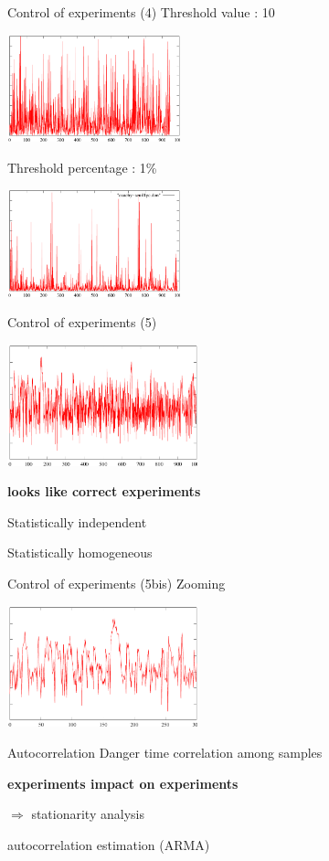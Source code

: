 \documentclass[xcolor=x11names,compress,8pt,
]{beamer}
\renewcommand{\(}{\begin{columns}}
\renewcommand{\)}{\end{columns}}
\newcommand{\<}[1]{\begin{column}{#1}}
\renewcommand{\>}{\end{column}}
\begin{document}
\begin{frame}{Control of experiments (4)}
Threshold value : 10
\begin{center}
\includegraphics[width=5cm]{CE-cauchy-seuil10.pdf}
\end{center}
Threshold percentage  : 1\%
\begin{center}
\includegraphics[width=5cm]{CE-cauchy-seuil1pc.pdf}
\end{center}

\end{frame}
\begin{frame}{Control of experiments (5)}
\begin{center}
\includegraphics[width=5.5cm]{CE-deptempo.pdf}
\end{center}
\pause
\begin{block}{}
\alert{\bf  looks like correct experiments}

Statistically independent

Statistically homogeneous
\end{block}
\end{frame}

\begin{frame}{Control of experiments (5bis)}
Zooming
\begin{center}
\includegraphics[width=5.5cm]{CE-deptempo-zoom.pdf}
\end{center}
\pause
\begin{block}{Autocorrelation}
Danger time correlation among samples

\alert{\bf  experiments impact on experiments}

$\Rightarrow$ stationarity analysis

autocorrelation estimation (ARMA)
\end{block}
\end{frame}
\end{document}
